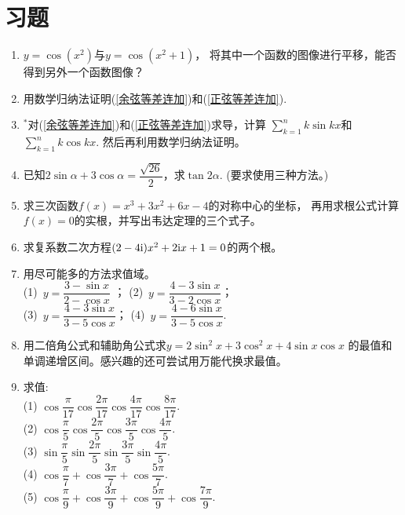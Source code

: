 \section{习题}
\begin{enumerate}[label={\textbf{\arabic*.}},leftmargin=
    \inteval{\myenumleftmargin}pt]
\item $ y=\cos(x^2) $与$ y=\cos(x^2+1) $，
将其中一个函数的图像进行平移，能否得到另外一个函数图像？

\item 用数学归纳法证明(\ref{余弦等差连加})和(\ref{正弦等差连加}).   

\item $ ^* $对(\ref{余弦等差连加})和(\ref{正弦等差连加})求导，计算
$ \sum\limits_{k=1}^{n}k\sin kx $和$ \sum\limits_{k=1}^{n}k\cos kx $. 
然后再利用数学归纳法证明。

\item 已知$ 2\sin\alpha+3\cos\alpha=\dfrac{\sqrt{26}}{2} $，求$ \tan2\alpha $.
(要求使用三种方法。)

\item 求三次函数$ f(x)=x^3+3x^2+6x-4 $的对称中心的坐标，
再用求根公式计算$ f(x)=0 $的实根，并写出韦达定理的三个式子。

\item 求复系数二次方程$ (2-4\mathrm{i})x^2+2\mathrm{i} x+1=0 $的两个根。

\item 用尽可能多的方法求值域。\\
(1)\ $ y=\dfrac{3-\sin x}{2-\cos x} $ ；\quad 
(2)\ $ y=\dfrac{4-3\sin x}{3-2\cos x} $；\\
(3)\ $ y=\dfrac{4-3\sin x}{3-5\cos x} $；\quad
(4)\ $ y=\dfrac{4-6\sin x}{3-5\cos x} $.

\item 用二倍角公式和辅助角公式求$ y=2\sin^2 x+3\cos^2 x+4\sin x\cos x $
的最值和单调递增区间。感兴趣的还可尝试用万能代换求最值。

\item 求值: \\
(1) $ \cos\dfrac{\pi}{17}\cos\dfrac{2\pi}{17}\cos\dfrac{4\pi}{17}
\cos\dfrac{8\pi}{17} $. \\
(2) $ \cos\dfrac{\pi}{5}\cos\dfrac{2\pi}{5}\cos\dfrac{3\pi}{5}
\cos\dfrac{4\pi}{5} $. \\
(3) $ \sin\dfrac{\pi}{5}\sin\dfrac{2\pi}{5}\sin\dfrac{3\pi}{5}
\sin\dfrac{4\pi}{5} $. \\
(4) $ \cos\dfrac{\pi}{7}+\cos\dfrac{3\pi}{7}+\cos\dfrac{5\pi}{7} $. \\
(5) $ \cos\dfrac{\pi}{9}+\cos\dfrac{3\pi}{9}+\cos\dfrac{5\pi}{9}+\cos\dfrac{7\pi}{9} $. 


\end{enumerate}
